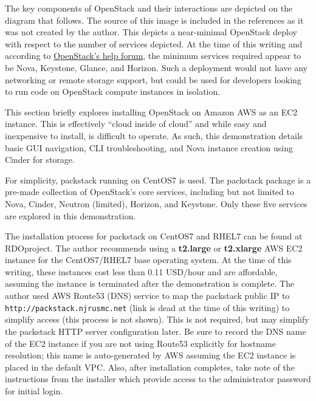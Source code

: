 The key components of OpenStack and their interactions are depicted on the
diagram that follows. The source of this image is included in the references as it
was not created by the author. This depicts a near-minimal OpenStack deploy
with respect to the number of services depicted. At the time of this writing
and according to
\href{https://ask.openstack.org/en/question/63268/installing-minimum-services-using-devstack/}{OpenStack’s help forum},
the minimum services required appear to be Nova, Keystone, Glance, and
Horizon. Such a deployment would not have any networking or remote storage
support, but could be used for developers looking to run code on OpenStack
compute instances in isolation.


This section briefly explores installing OpenStack on Amazon AWS as an EC2
instance. This is effectively ``cloud inside of cloud'' and while easy and
inexpensive to install, is difficult to operate. As such, this demonstration
details basic GUI navigation, CLI troubleshooting, and Nova instance creation
using Cinder for storage.

For simplicity, packstack running on CentOS7 is used. The packstack package is
a pre-made collection of OpenStack’s core services, including but not limited
to Nova, Cinder, Neutron (limited), Horizon, and Keystone. Only these five
services are explored in this demonstration.

The installation process for packstack on CentOS7 and RHEL7 can be found at
RDOproject. The author recommends using a \textbf{t2.large} or
\textbf{t2.xlarge} AWS EC2 instance for the CentOS7/RHEL7 base operating
system. At the time of this writing, these instances cost less than 0.11
USD/hour and are affordable, assuming the instance is terminated after the
demonstration is complete. The author used AWS Route53 (DNS) service to map
the packstack public IP to \verb|http://packstack.njrusmc.net| (link is dead
at the time of this writing) to simplify access (this process is not shown).
This is not required, but may simplify the packstack HTTP server configuration
later. Be sure to record the DNS name of the EC2 instance if you are not using
Route53 explicitly for hostname resolution; this name is auto-generated by AWS
assuming the EC2 instance is placed in the default VPC\@. Also, after
installation completes, take note of the instructions from the installer which
provide access to the administrator password for initial login.

